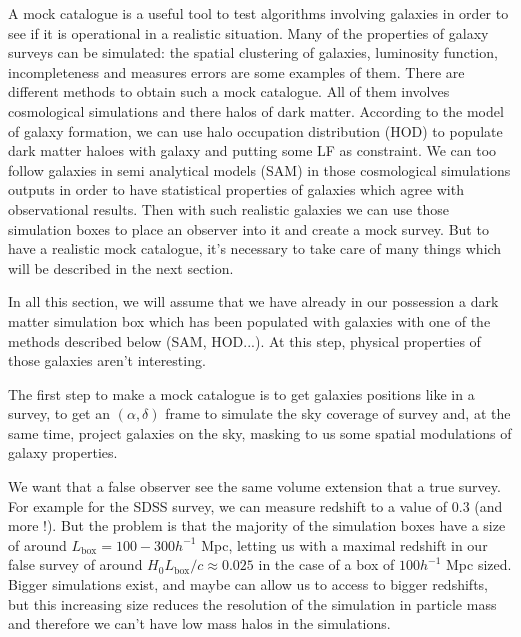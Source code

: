 
\minitoc


A mock catalogue is a useful tool to test algorithms involving galaxies in order to see if it
is operational in a realistic situation. Many of the properties of galaxy surveys can be simulated: the spatial clustering of
galaxies, luminosity function, incompleteness and measures errors are some examples of them. There are different methods to obtain
such a mock catalogue. All of them involves cosmological simulations and there halos of dark matter. According to the model of
galaxy formation, we can use halo occupation distribution (HOD) to populate dark matter haloes with galaxy and putting some LF as
constraint. We can too follow galaxies in semi analytical models (SAM) in those cosmological simulations outputs in order to have
statistical properties of galaxies which agree with observational results. Then with such realistic galaxies we can use those
simulation boxes to place an observer into it and create a mock survey. But to have a realistic mock catalogue, it's necessary to
take care of many things which will be described in the next section.


In all this section, we will assume that we have already in our possession a dark matter simulation box which has been populated
with galaxies with one of the methods described below (SAM, HOD...). At this step, physical properties of those galaxies aren't
interesting.


The first step to make a mock catalogue is to get galaxies positions like in a survey, to get an $(\alpha,\delta)$ frame to simulate
the sky coverage of survey and, at the same time, project galaxies on the sky, masking to us some spatial modulations of galaxy
properties.

We want that a false observer see the same volume extension that a true survey. For example for the SDSS survey, we can measure
redshift to a value of 0.3 (and more !). But the problem is that the majority of the simulation boxes have a size of around
$L_{\mathrm{box}}=\num{100}-\num{300} h^{-1}$ Mpc, letting us with a maximal redshift in our false survey of around
${H_0}{L_{\mathrm{box}}}/c\approx\num{0.025}$ in the case of a box of $\num{100} h^{-1}$ Mpc sized. Bigger simulations exist, and
maybe can allow us to access to bigger redshifts, but this increasing size reduces the resolution of the simulation in particle mass
and therefore we can't have low mass halos in the simulations.

